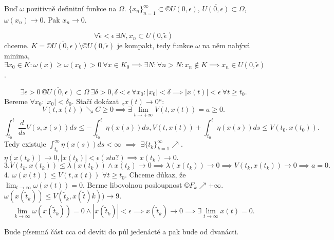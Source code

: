 \documentclass[12pt]{article}					%
\begin{document}
\begin{lemma}
	Buď $\omega$ pozitivně definitní funkce na $\Omega$. $\{x_n\}_{n=1}^∞ \subset ©U(0, \epsilon)$, $\overline{U(0, \epsilon)} \subset \Omega$, $\omega(x_n) \rightarrow 0$. Pak $x_n \rightarrow 0$.

	\begin{dukazin}
		$$ \forall \tilde \epsilon < \epsilon\ \exists N, x_n \subset U(0, \tilde \epsilon) $$
		chceme. $K = \overline{©U(0, \epsilon)} \setminus ©U(0, \tilde \epsilon)$ je kompakt, tedy funkce $\omega$ na něm nabývá minima, $\exists x_0 \in K: \omega(x) ≥ \omega(x_0) >  0\ \forall x \in K_0 \implies \exists N: \forall n > N: x_n \notin K \implies x_n \in U(0, \tilde \epsilon)$.
	\end{dukazin}
\end{lemma}

\begin{dukaz}
	$$ \exists \epsilon > 0\ \overline{©U(0, \epsilon)} \subset \Omega\ \exists \delta > 0, \delta < \epsilon\ \forall x_0: |x_0| < \delta \implies |x(t)| < \epsilon\ \forall t ≥ t_0. $$
	Bereme $\forall x_0: |x_0| < \delta_0$. Stačí dokázat „$x(t) \rightarrow 0$“:
	$$ V(t, x(t)) \searrow C ≥ 0 \implies \exists \lim_{t \rightarrow +∞} V(t, x(t)) = a ≥ 0. $$
	$$ \int_{t_0}^t \frac{d}{ds} V(s, x(s)) ds ≤ - \int_{t_0}^t \eta(x(s))ds, V(t, x(t)) + \int_{t_0}^t \eta(x(s))ds ≤ V(t_0, x(t_0)). $$
	Tedy existuje $\int_{t_0}^∞ \eta(x(s)) ds < ∞$ $\implies$ $\exists \{t_k\}_{k=1}^∞ \nearrow$. $\eta(x(t_k)) \rightarrow 0, |x(t_k)| < \epsilon(sta?) \implies x(t_k) \rightarrow 0$.
	$$ 3. V(t_k, x(t_k)) ≤ \lambda(x(t_k)) \land x(t_k) \rightarrow 0 \implies \lambda(x(t_k)) \rightarrow 0 \implies V(t_k, x(t_k)) \rightarrow 0 \implies a = 0. $$
	4. $\omega(x(t)) ≤ V(t, x(t))$ $\forall t ≥ t_0$. Chceme důkaz, že $\lim_{t \rightarrow ∞} \omega(x(t)) = 0$. Berme libovolnou posloupnost $©F_k \nearrow +∞$. $\omega(x(\tilde t_k)) ≤ V(\tilde t_k, x(\tilde t)k)) \rightarrow 9$.
	$$ \lim_{k \rightarrow ∞} \omega(x(\tilde t_k)) = 0 \land |x(\tilde t_k)| < \epsilon \implies x(\tilde t_k) \rightarrow 0 \implies \exists \lim_{t \rightarrow ∞} x(t) = 0. $$
\end{dukaz}

\begin{poznamka}[Zkouška]
	Bude písemná část cca od devíti do půl jedenácté a pak bude od dvanácti.
\end{poznamka}
\end{document}
